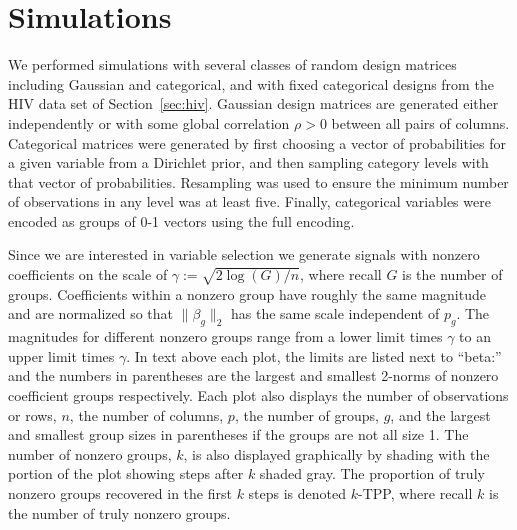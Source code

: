 \documentclass{imsart}
\begin{document}
\section{Simulations}
\label{sec:simulations}

We performed simulations with several classes of random design matrices
including Gaussian and categorical, and with fixed categorical designs
from the HIV data set of Section~\ref{sec:hiv}. Gaussian
design matrices are generated either independently or with some global
correlation $\rho > 0$ between all pairs of columns. Categorical matrices
were generated by first choosing a vector of probabilities for a given
variable from a Dirichlet prior, and then sampling category levels with
that vector of probabilities. Resampling was used to ensure the minimum
number of observations in any level was at least five. Finally, categorical
variables were encoded as groups of 0-1 vectors using the full encoding.

Since we are interested in variable selection we generate signals with
nonzero coefficients on the scale of $\gamma := \sqrt{2 \log(G)/n}$,
where recall $G$ is the number of groups.
Coefficients within a
nonzero group have roughly the same magnitude and are normalized
so that $\| \beta_g \|_2$ has the same scale independent of $p_g$.
The magnitudes for different
nonzero groups range from a lower limit times $\gamma$ to an upper
limit times $\gamma$. In text above each plot, the limits are listed
next to ``beta:'' and the numbers in parentheses are the largest
and smallest 2-norms of nonzero coefficient groups respectively.
Each plot also displays the
number of observations or rows, $n$, the number of columns, $p$, the
number of groups, $g$, and the largest and smallest group sizes in
parentheses if the groups are not all size 1. The number of nonzero
groups, $k$, is also displayed graphically by shading with the portion
of the plot showing steps after $k$ shaded gray.
The proportion of truly
nonzero groups recovered in the first $k$ steps is denoted $k$-TPP,
where recall $k$ is the number of truly nonzero groups. 
\end{document}
